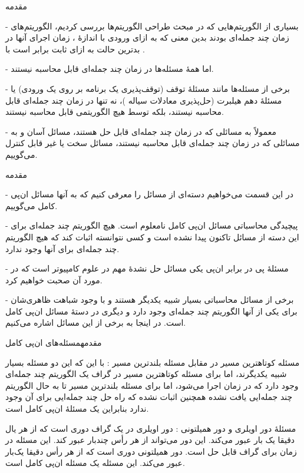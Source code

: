 \begin{itemframe}{مقدمه}
\decLineSpace[1mm] %
\item[-]
بسیاری از الگوریتم‌هایی که در مبحث طراحی الگوریتم‌ها بررسی کردیم، الگوریتم‌های زمان
چند جمله‌ای بودند بدین معنی که به ازای ورودی با اندازهٔ
، زمان اجرای آنها در بدترین حالت به ازای ثابت
برابر است با
 .
\item[-]
اما همهٔ مسئله‌ها در زمان چند جمله‌ای قابل محاسبه نیستند.
\item[-]
برخی از مسئله‌ها مانند مسئلهٔ توقف
(توقف‌پذیری یک برنامه بر روی یک ورودی)
یا مسئلهٔ دهم هیلبرت (حل‌پذیری معادلات سیاله
)،
 نه تنها در زمان چند جمله‌ای قابل محاسبه نیستند، بلکه توسط هیچ الگوریتمی قابل محاسبه نیستند.
\item[-]
معمولاً به مسائلی که در زمان چند جمله‌ای قابل حل هستند، مسائل آسان و به مسائلی که در زمان چند جمله‌ای قابل محاسبه نیستند، مسائل سخت
یا غیر قابل کنترل
می‌گوییم.

\end{itemframe}


\begin{itemframe}{مقدمه}
\item[-]
در این قسمت می‌خواهیم دسته‌ای از مسائل را معرفی کنیم که به آنها مسائل ان‌پی کامل
می‌گوییم.
\item[-]
پیچیدگی محاسباتی مسائل ان‌پی کامل نامعلوم است. هیچ الگوریتم چند جمله‌ای برای این دسته از مسائل تاکنون پیدا نشده است و کسی نتوانسته اثبات کند که هیچ الگوریتم چند جمله‌ای برای آنها وجود ندارد.
\item[-]
مسئلهٔ پی در برابر ان‌پی
یکی مسائل حل نشدهٔ مهم در علوم کامپیوتر است که در مورد آن صحبت خواهیم کرد.
\item[-]
برخی از مسائل محاسباتی بسیار شبیه یکدیگر هستند و با وجود شباهت ظاهری‌شان برای یکی از آنها الگوریتم چند جمله‌ای وجود دارد و دیگری در دستهٔ مسائل ان‌پی کامل است. در اینجا به برخی از این مسائل اشاره می‌کنیم.
\end{itemframe}


\begin{itemframe-s}{مقدمه}{مسئله‌های ان‌پی کامل}
\item[-]
مسئله کوتاهترین مسیر در مقابل مسئله بلندترین مسیر : با این که این دو مسئله بسیار شبیه یکدیگرند، اما برای مسئله کوتاهترین مسیر در گراف یک الگوریتم چند جمله‌ای وجود دارد که در زمان
اجرا می‌شود، اما برای مسئله بلندترین مسیر تا به حال الگوریتم چند جمله‌ایی یافت نشده همچنین اثبات نشده که راه حل چند جمله‌ایی برای آن وجود ندارد بنابراین یک مسئلهٔ ان‌پی کامل است.
\item[-]
مسئلهٔ دور اویلری و دور همیلتونی : دور اویلری
در یک گراف دوری است که از هر یال دقیقا یک بار عبور می‌کند. این دور می‌تواند از هر رأس چندبار عبور کند. این مسئله در زمان
برای گراف
قابل حل است.  دور همیلتونی
 دوری است که از هر رأس دقیقا یک‌بار عبور می‌کند. این مسئله یک مسئله ان‌پی کامل است.
\end{itemframe-s}


